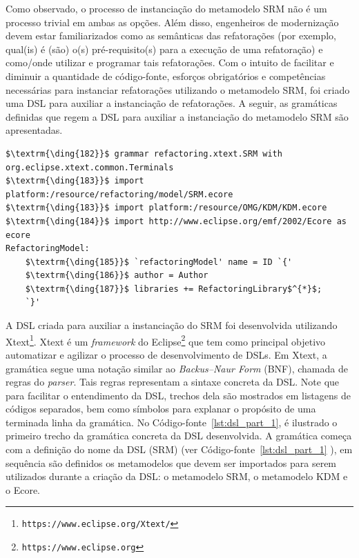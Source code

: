 Como observado, o processo de instanciação do metamodelo SRM não é um processo trivial em ambas as opções. Além disso, engenheiros de modernização devem estar familiarizados como as semânticas das refatorações (por exemplo, qual(is) é (são) o(s) pré-requisito(s) para a execução de uma refatoração) e como/onde utilizar e programar tais refatorações. Com o intuito de facilitar e diminuir a quantidade de código-fonte, esforços obrigatórios e competências necessárias para instanciar refatorações utilizando o metamodelo SRM, foi criado uma DSL para auxiliar a instanciação de refatorações. A seguir, as gramáticas definidas que regem a DSL para auxiliar a instanciação do metamodelo SRM são apresentadas.

\begin{lstlisting}[language=Xtext, frame=single, basicstyle={\scriptsize}, mathescape=true, label={lst:dsl_part_1}, caption={Gramática da DSL - parte 1}]
$\textrm{\ding{182}}$ grammar refactoring.xtext.SRM with org.eclipse.xtext.common.Terminals 
$\textrm{\ding{183}}$ import platform:/resource/refactoring/model/SRM.ecore
$\textrm{\ding{183}}$ import platform:/resource/OMG/KDM/KDM.ecore
$\textrm{\ding{184}}$ import http://www.eclipse.org/emf/2002/Ecore as ecore
RefactoringModel: 
	$\textrm{\ding{185}}$ `refactoringModel' name = ID `{'
	$\textrm{\ding{186}}$ author = Author
	$\textrm{\ding{187}}$ libraries += RefactoringLibrary$^{*}$;
	`}'
\end{lstlisting}

%
%
A DSL criada para auxiliar a instanciação do SRM foi desenvolvida utilizando Xtext\footnote{\texttt{https://www.eclipse.org/Xtext/}}. Xtext é um \textit{framework} do Eclipse\footnote{\texttt{https://www.eclipse.org}} que tem como principal objetivo automatizar e agilizar o processo de desenvolvimento de DSLs. %
%
Em Xtext, a gramática segue uma notação similar ao \textit{Backus–Naur Form} (BNF), chamada de regras do \textit{parser}. Tais regras representam a sintaxe concreta da DSL. Note que para facilitar o entendimento da DSL, trechos dela são mostrados em listagens de códigos separados, bem como símbolos para explanar o propósito de uma terminada linha da gramática. No Código-fonte~\ref{lst:dsl_part_1}, é ilustrado o primeiro trecho da gramática concreta da DSL desenvolvida. A gramática começa com a definição do nome da DSL (SRM) (ver Código-fonte~\ref{lst:dsl_part_1} ), em sequência são definidos os metamodelos que devem ser importados para serem utilizados durante a criação da DSL: o metamodelo SRM, o metamodelo KDM e o Ecore.


